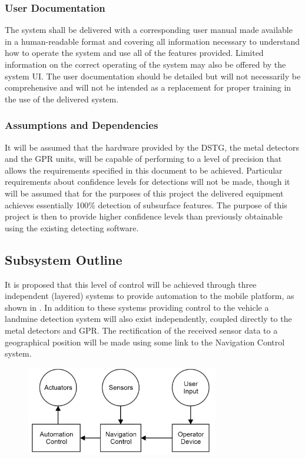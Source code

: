 \documentclass[main.tex]{subfiles}
\begin{document}
\begin{appendices}
\subsubsection{User Documentation}
The system shall be delivered with a corresponding user manual made available in a human-readable format and covering all information necessary to understand how to operate the system and use all of the features provided. Limited information on the correct operating of the system may also be offered by the system UI. The user documentation should be detailed but will not necessarily be comprehensive and will not be intended as a replacement for proper training in the use of the delivered system.
\subsubsection{Assumptions and Dependencies}
It will be assumed that the hardware provided by the DSTG, the metal detectors and the GPR units, will be capable of performing to a level of precision that allows the requirements specified in this document to be achieved. 
Particular requirements about confidence levels for detections will not be made, though it will be assumed that for the purposes of this project the delivered equipment achieves essentially 100\% detection of subsurface features. 
The purpose of this project is then to provide higher confidence levels than previously obtainable using the existing detecting software.
 
\subsection{Subsystem Outline}
It is proposed that this level of control will be achieved through three independent (layered) systems to provide automation to the mobile platform, as shown in .
In addition to these systems providing control to the vehicle a landmine detection system will also exist independently, coupled directly to the metal detectors and GPR. 
The rectification of the received sensor data to a geographical position will be made using some link to the Navigation Control system.

\begin{figure}
\centering
\includegraphics[width=0.75\textwidth]{8-Appendices/bloop.PNG}


\end{figure}
\end{appendices}
\end{document}
